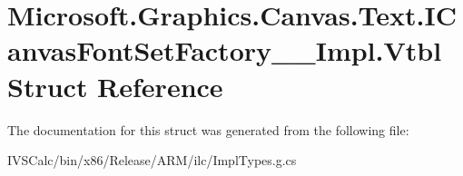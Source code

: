 \hypertarget{struct_microsoft_1_1_graphics_1_1_canvas_1_1_text_1_1_i_canvas_font_set_factory_____impl_1_1_vtbl}{}\section{Microsoft.\+Graphics.\+Canvas.\+Text.\+I\+Canvas\+Font\+Set\+Factory\+\_\+\+\_\+\+Impl.\+Vtbl Struct Reference}
\label{struct_microsoft_1_1_graphics_1_1_canvas_1_1_text_1_1_i_canvas_font_set_factory_____impl_1_1_vtbl}


The documentation for this struct was generated from the following file\+:\begin{DoxyCompactItemize}
\item 
I\+V\+S\+Calc/bin/x86/\+Release/\+A\+R\+M/ilc/Impl\+Types.\+g.\+cs\end{DoxyCompactItemize}
